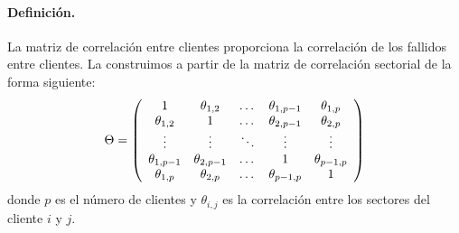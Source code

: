 \paragraph{Definici\'on.} La matriz de correlaci\'on entre clientes proporciona
la correlaci\'on de los fallidos entre clientes. La construimos a partir de la
matriz de correlaci\'on sectorial de la forma siguiente:
\begin{displaymath}
\Theta = \left(
\begin{array}{ccccc}
1              & \theta_{1,2}   & \dots      & \theta_{1,p-1} & \theta_{1,p}   \cr
\theta_{1,2}   & 1              & \dots      & \theta_{2,p-1} & \theta_{2,p}   \cr
\vdots         & \vdots         & \ddots     & \vdots         & \vdots         \cr
\theta_{1,p-1} & \theta_{2,p-1} & \dots      & 1              & \theta_{p-1,p} \cr
\theta_{1,p}   & \theta_{2,p}   & \dots      & \theta_{p-1,p} & 1
\end{array}
\right)
\end{displaymath}
donde $p$ es el n\'umero de clientes y $\theta_{i,j}$ es la correlaci\'on entre
los sectores del cliente $i$ y $j$.


